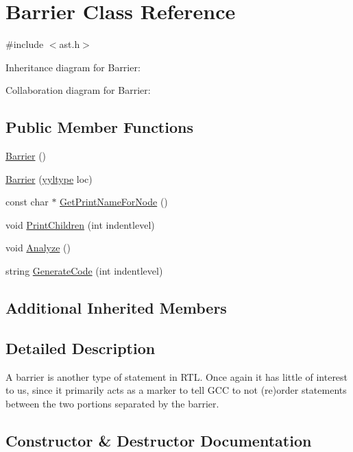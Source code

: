 \hypertarget{class_barrier}{}\section{Barrier Class Reference}
\label{class_barrier}


{\ttfamily \#include $<$ast.\+h$>$}



Inheritance diagram for Barrier\+:


Collaboration diagram for Barrier\+:
\subsection*{Public Member Functions}
\begin{DoxyCompactItemize}
\item 
\hyperlink{class_barrier_a462a2435e07b6fabc0265011f03310ee}{Barrier} ()
\item 
\hyperlink{class_barrier_acbb7d7324fef5bfefd7424c957b5c25d}{Barrier} (\hyperlink{structyyltype}{yyltype} loc)
\item 
const char $\ast$ \hyperlink{class_barrier_a3b32a126f5fb975defc7f8c3614a0c68}{Get\+Print\+Name\+For\+Node} ()
\item 
void \hyperlink{class_barrier_a4210ab976223e77243f019045f0f3875}{Print\+Children} (int indentlevel)
\item 
void \hyperlink{class_barrier_af36430f51da20c09b6e3fa1d6e875fef}{Analyze} ()
\item 
string \hyperlink{class_barrier_a8b5b9b199e68d00ae5d11336a1b4591f}{Generate\+Code} (int indentlevel)
\end{DoxyCompactItemize}
\subsection*{Additional Inherited Members}


\subsection{Detailed Description}
A barrier is another type of statement in R\+TL. Once again it has little of interest to us, since it primarily acts as a marker to tell G\+CC to not (re)order statements between the two portions separated by the barrier. 

\subsection{Constructor \& Destructor Documentation}
\mbox{\label{class_barrier_a462a2435e07b6fabc0265011f03310ee}} 
